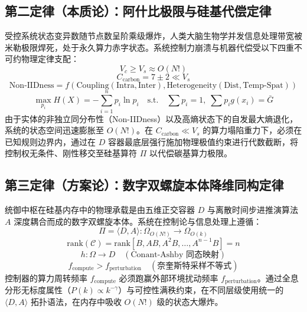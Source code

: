 \documentclass[11pt,a4paper]{article}
\begin{document}
\subsection*{第二定律（本质论）：阿什比极限与硅基代偿定律}
受控系统状态变异数随节点数呈阶乘级爆炸，人类大脑生物学并发信息处理带宽被米勒极限焊死，处于永久算力赤字状态。系统控制力崩溃与机器代偿受以下四重不可约物理定律支配：
\begin{equation}
    V_c \ge V_s \approx O(N!)
\end{equation}
\begin{equation}
    C_{\text{carbon}} = 7 \pm 2 \ll V_s
\end{equation}
\begin{equation}
    \text{Non-IIDness} = f\left(\text{Coupling}(\text{Intra}, \text{Inter}), \text{Heterogeneity}(\text{Dist}, \text{Temp-Spat})\right)
\end{equation}
\begin{equation}
    \max_{p_i} H(X) = -\sum_{i=1}^{n} p_i \ln p_i \quad \text{s.t.} \quad \sum p_i = 1, \; \sum p_i g(x_i) = \bar{G}
\end{equation}
由于实体的非独立同分布性（Non-IIDness）以及高熵状态下的自发最大熵退化，系统的状态空间迅速膨胀至 $O(N!)$。在 $C_{\text{carbon}} \ll V_s$ 的算力塌陷重力下，必须在已知规则边界内，通过在 $D$ 容器最底层强行施加物理极值约束进行代数截断，将控制权无条件、刚性移交至硅基算符 $\Pi$ 以代偿碳基算力极限。

\subsection*{第三定律（方案论）：数字双螺旋本体降维同构定律}
统御中枢在硅基内存中的物理承载是由五维正交容器 $D$ 与离散时间步进推演算法 $A$ 深度耦合而成的数字双螺旋本体。系统在控制论与信息处理上遵循：
\begin{equation}
    \Pi = \langle D, A \rangle : \Omega_{O(N!)} \longrightarrow \Omega_{O(k)}
\end{equation}
\begin{equation}\label{controllability}
    \text{rank}(\mathcal{C}) = \text{rank}\left[ B, AB, A^2B, \dots, A^{n-1}B \right] = n
\end{equation}
\begin{equation}
    h: \Omega \longrightarrow D \quad (\text{Conant-Ashby 同态映射})
\end{equation}
\begin{equation}\label{sampling}
    f_{\text{compute}} > f_{\text{perturbation}} \quad (\text{奈奎斯特采样不等式})
\end{equation}
控制器的算力周转频率 $f_{\text{compute}}$ 必须跑赢外部环境扰动频率 $f_{\text{perturbation}}$。通过全息分形无标度属性（$P(k) \propto k^{-\gamma}$）与可控性满秩约束，在不同层级使用统一的 $\langle D,A \rangle$ 拓扑语法，在内存中吸收 $O(N!)$ 级的状态大爆炸。
\end{document}
